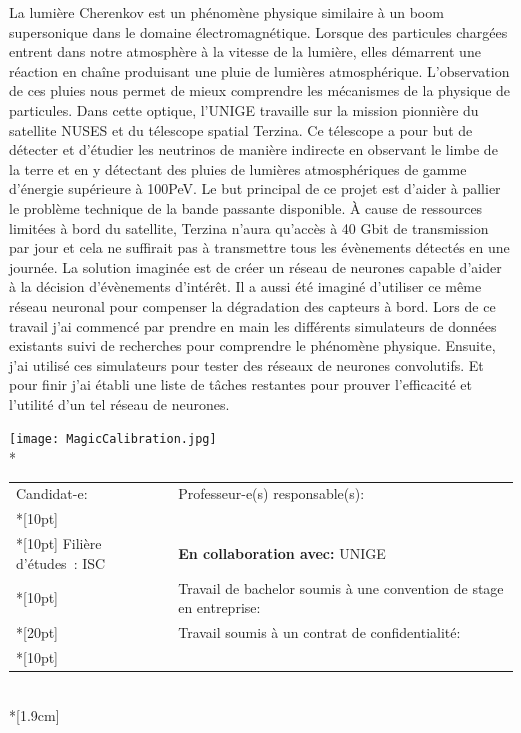 \begin{spacing}{0.956}
\vspace{0.5cm}

La lumière Cherenkov est un phénomène physique similaire à un boom supersonique dans le domaine électromagnétique.
Lorsque des particules chargées entrent dans notre atmosphère à la vitesse de la lumière, 
elles démarrent une réaction en chaîne produisant une pluie de lumières atmosphérique.
L’observation de ces pluies nous permet de mieux comprendre les mécanismes de la physique de particules. 
Dans cette optique, l’UNIGE travaille sur la mission pionnière du satellite NUSES et du télescope spatial Terzina. 
Ce télescope a pour but de détecter et d’étudier les neutrinos de manière indirecte en observant le limbe de la terre 
et en y détectant des pluies de lumières atmosphériques de gamme d'énergie supérieure à 100PeV. 
Le but principal de ce projet est d'aider à pallier le problème technique de la bande passante disponible. 
À cause de ressources limitées à bord du satellite, Terzina n’aura qu'accès à 40 Gbit de transmission par jour et cela ne suffirait 
pas à transmettre tous les évènements détectés en une journée. La solution imaginée est de créer un réseau de neurones
capable d'aider à la décision d'évènements d'intérêt. Il a aussi été imaginé d'utiliser ce même réseau neuronal
pour compenser la dégradation des capteurs à bord. Lors de ce travail j'ai commencé par prendre en main les différents
simulateurs de données existants suivi de recherches pour comprendre le phénomène physique. 
Ensuite, j'ai utilisé ces simulateurs pour tester des réseaux de neurones convolutifs. 
Et pour finir j'ai établi une liste de tâches restantes pour prouver l'efficacité et l'utilité d'un tel réseau de neurones.

\vfill
\begin{center}
	{\texttt{[image: MagicCalibration.jpg]}}\\*
\vfill

{
	\begin{tabular*}{16cm}{p{7.59cm} p{7.58cm}}
		\small Candidat-e:					&	\small Professeur-e(s) responsable(s):\\*[10pt]
		\small\textbf{\textsc{\Author}}		&	\small\textbf{\textsc{\Professor}}\\*[10pt]
		\footnotesize  Filière d’études : ISC	&	\footnotesize  \textbf{En collaboration avec:} UNIGE\\*[10pt]
		\footnotesize  {} & \footnotesize  Travail de bachelor soumis à une convention de stage en entreprise: \Convention\\*[20pt]
		\footnotesize  {} & \footnotesize  Travail soumis à un contrat de confidentialité: \Confidentiel\\*[10pt]
	\end{tabular*}\\*[1.9cm]
}
\end{center}
\end{spacing}
